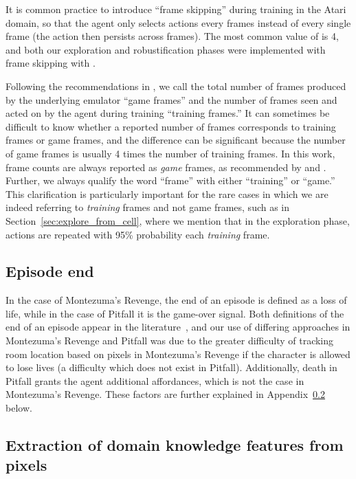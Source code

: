 \documentclass{article}
\begin{document}
It is common practice to introduce ``frame skipping'' during training in the Atari domain, so that the agent only selects actions every  frames instead of every single frame (the action then persists across  frames). The most common value of  is 4, and both our exploration and robustification phases were implemented with frame skipping with .

Following the recommendations in \citet{such:arxiv17}, we call the total number of frames produced by the underlying emulator ``game frames'' and the number of frames seen and acted on by the agent during training ``training frames.'' It can sometimes be difficult to know whether a reported number of frames corresponds to training frames or game frames, and the difference can be significant because the number of game frames is usually 4 times the number of training frames. In this work, frame counts are always reported as \emph{game} frames, as recommended by \citet{such:arxiv17} and \citet{Machado2018RevisitingTA}. Further, we always qualify the word ``frame'' with either ``training'' or ``game.'' This clarification is particularly important for the rare cases in which we are indeed referring to \emph{training} frames and not game frames, such as in Section~\ref{sec:explore_from_cell}, where we mention that in the exploration phase, actions are repeated with 95\% probability each \emph{training} frame.

\subsection{Episode end}
\label{sec:episode_end}

In the case of Montezuma's Revenge, the end of an episode is defined as a loss of life, while in the case of Pitfall it is the game-over signal. Both definitions of the end of an episode appear in the literature~\cite{Machado2018RevisitingTA}, and our use of differing approaches in Montezuma's Revenge and Pitfall was due to the greater difficulty of tracking room location based on pixels in Montezuma's Revenge if the character is allowed to lose lives (a difficulty which does not exist in Pitfall). Additionally, death in Pitfall grants the agent additional affordances, which is not the case in Montezuma's Revenge.
These factors are further explained in Appendix~\ref{sec:domain_from_pixels} below.

\subsection{Extraction of domain knowledge features from pixels}
\label{sec:domain_from_pixels}
\end{document}
